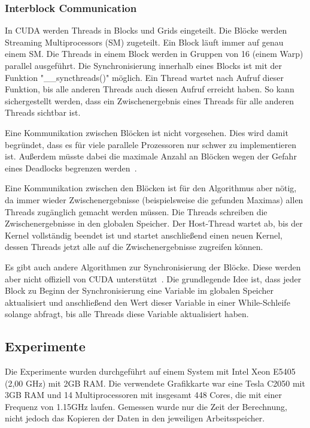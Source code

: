 \documentclass[ngerman]{scrartcl}
\begin{document}
\subsubsection{Interblock Communication}
In CUDA werden Threads in Blocks und Grids eingeteilt.
Die Blöcke werden Streaming Multiprocessors (SM) zugeteilt.
Ein Block läuft immer auf genau einem SM.
Die Threads in einem Block werden in Gruppen von 16 (einem Warp) parallel ausgeführt.
Die Synchronisierung innerhalb eines Blocks ist mit der Funktion "\_\_syncthreads()" möglich.
Ein Thread wartet nach Aufruf dieser Funktion, bis alle anderen Threads auch diesen Aufruf erreicht haben.
So kann sichergestellt werden, dass ein Zwischenergebnis eines Threads für alle anderen Threads sichtbar ist.

Eine Kommunikation zwischen Blöcken ist nicht vorgesehen.
Dies wird damit begründet, dass es für viele parallele Prozessoren nur schwer zu implementieren ist.
Außerdem müsste dabei die maximale Anzahl an Blöcken wegen der Gefahr eines Deadlocks begrenzen werden~\cite{parallelreduction}.

Eine Kommunikation zwischen den Blöcken ist für den Algorithmus aber nötig, da immer wieder Zwischenergebnisse (beispielsweise die gefunden Maximas) allen Threads zugänglich gemacht werden müssen.
Die Threads schreiben die Zwischenergebnisse in den globalen Speicher. Der Host-Thread wartet ab, bis der Kernel vollständig beendet ist und startet anschließend einen neuen Kernel, dessen Threads jetzt alle auf die Zwischenergebnisse zugreifen können.

Es gibt auch andere Algorithmen zur Synchronisierung der Blöcke. Diese werden aber nicht offiziell von CUDA unterstützt~\cite{interblockgpusync}.
Die grundlegende Idee ist, dass jeder Block zu Beginn der Synchronisierung eine Variable im globalen Speicher aktualisiert und anschließend den Wert dieser Variable in einer While-Schleife solange abfragt, bis alle Threads diese Variable aktualisiert haben.
\subsection{Experimente}
Die Experimente wurden durchgeführt auf einem System mit Intel Xeon E5405 (2,00 GHz) mit 2GB RAM. 
Die verwendete Grafikkarte war eine Tesla C2050 mit 3GB RAM und 14 Multiprocessoren mit insgesamt 448 Cores, die mit einer Frequenz von 1.15GHz laufen. Gemessen wurde nur die Zeit der Berechnung, nicht jedoch das Kopieren der Daten in den jeweiligen Arbeitsspeicher.
\end{document}
